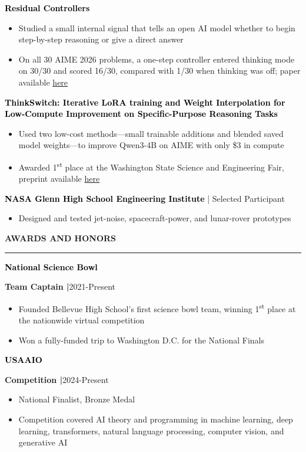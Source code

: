 \documentclass[8pt,a4paper]{altacv}
\newcommand{\resumebodysize}{\fontsize{8pt}{9pt}\selectfont}
\renewcommand{\divider}{\textcolor{body!30}{\hdashrule{\linewidth}{0.6pt}{0.285em}}\vspace{2.5pt}}
\renewcommand{\cvsection}[2][]{%
  \bigskip%
  \vspace{3.686pt}%
  \ifstrequal{#1}{}{}{\marginpar{\vspace*{\dimexpr1pt-\baselineskip}\raggedright}}%
  {\color{heading}\large\bfseries\MakeUppercase{#2}}\\[-1ex]\vspace{1.489pt}%
  {\color{heading}\rule{\linewidth}{2pt}\par}\medskip\vspace{1.179pt}
}
\renewcommand{\cvevent}[4]{%
  {\fontsize{9pt}{9pt}\selectfont\color{black}\hspace*{-0.282pt}#1\par}
  \ifstrequal{#2}{}{}{%
    \vspace{2.144pt}
    {\fontsize{9pt}{9pt}\selectfont\textbf{\color{accent}#2}\hspace{0.5em}\resumebodysize\faCalendar\hspace{0.5em}#3\par}%
  }%
  \vspace{2.145pt}\resumebodysize
}
\begin{document}
\cvevent{\textcolor{black}{\textbf{Residual Controllers}}}{}{}{}
\begin{itemize}
\item Studied a small internal signal that tells an open AI model whether to begin step-by-step reasoning or give a direct answer
\item On all 30 AIME 2026 problems, a one-step controller entered thinking mode on 30/30 and scored 16/30, compared with 1/30 when thinking was off; paper available \href{https://cdn.jsdelivr.net/gh/dhruv9saini/residual-controllers@master/paper/main.pdf}{here}
\end{itemize}
\divider

\cvevent{\textcolor{black}{\textbf{ThinkSwitch: Iterative LoRA training and Weight Interpolation for Low-Compute Improvement on Specific-Purpose Reasoning Tasks}}}{}{}{}
\begin{itemize}
\item Used two low-cost methods---small trainable additions and blended saved model weights---to improve Qwen3-4B on AIME with only \$3 in compute
\item Awarded 1\textsuperscript{st} place at the Washington State Science and Engineering Fair, preprint available \href{https://arxiv.org/abs/2606.01080}{here}
\end{itemize}
\divider

\cvevent{\textcolor{black}{\textbf{NASA Glenn High School Engineering Institute}} \textnormal{| Selected Participant}}{}{}{}
\begin{itemize}
\item Designed and tested jet-noise, spacecraft-power, and lunar-rover prototypes
\end{itemize}

\vskip-4.273pt
\cvsection{Awards and Honors}
\vskip0.464pt

\cvevent{\textcolor{black}{\textbf{National Science Bowl}}}{\textnormal{Team Captain |}}{2021-Present}{}
\begin{itemize}
\item Founded Bellevue High School’s first science bowl team, winning 1\textsuperscript{st} place at the nationwide virtual competition
\item Won a fully-funded trip to Washington D.C. for the National Finals
\end{itemize}
\divider

\cvevent{\textcolor{black}{\textbf{USAAIO}}}{\textnormal{Competition |}}{2024-Present}{}
\begin{itemize}
\item National Finalist, Bronze Medal
\item Competition covered AI theory and programming in machine learning, deep learning, transformers, natural language processing, computer vision, and generative AI
\end{itemize}
\divider
\end{document}
